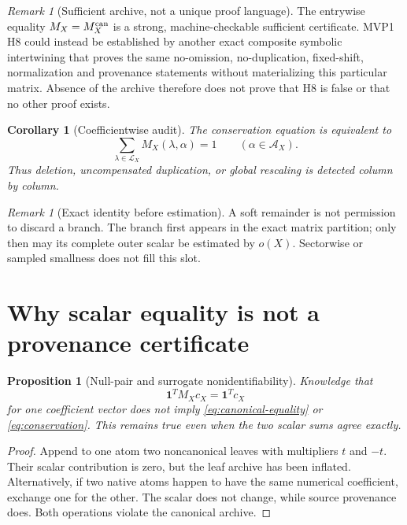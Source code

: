 \documentclass[11pt,a4paper]{article}
\newtheorem{proposition}[theorem]{Proposition}
\newtheorem{corollary}[theorem]{Corollary}
\theoremstyle{definition}
\theoremstyle{remark}
\newtheorem{remark}[theorem]{Remark}
\newcommand{\one}{\mathbf 1}
\newcommand{\cA}{\mathcal A}
\newcommand{\cL}{\mathcal L}
\begin{document}
\begin{remark}[Sufficient archive, not a unique proof language]
\label{rem:not-necessary}
The entrywise equality \(M_X=M_X^{\rm can}\) is a strong,
machine-checkable sufficient certificate.  MVP1 H8 could instead be
established by another exact composite symbolic intertwining that
proves the same no-omission, no-duplication, fixed-shift,
normalization and provenance statements without materializing this
particular matrix.  Absence of the archive therefore does not prove
that H8 is false or that no other proof exists.
\end{remark}

\begin{corollary}[Coefficientwise audit]
\label{cor:column}
The conservation equation is equivalent to
\[
 \sum_{\lambda\in\cL_X}M_X(\lambda,\alpha)=1
 \qquad(\alpha\in\cA_X).
\]
Thus deletion, uncompensated duplication, or global rescaling is
detected column by column.
\end{corollary}

\begin{remark}[Exact identity before estimation]
A soft remainder is not permission to discard a branch.  The branch
first appears in the exact matrix partition; only then may its complete
outer scalar be estimated by \(o(X)\).  Sectorwise or sampled smallness
does not fill this slot.
\end{remark}

\section{Why scalar equality is not a provenance certificate}

\begin{proposition}[Null-pair and surrogate nonidentifiability]
\label{prop:null}
Knowledge that
\[
 \one^TM_Xc_X=\one^Tc_X
\]
for one coefficient vector does not imply
\eqref{eq:canonical-equality} or \eqref{eq:conservation}.  This remains
true even when the two scalar sums agree exactly.
\end{proposition}

\begin{proof}
Append to one atom two noncanonical leaves with multipliers \(t\) and
\(-t\).  Their scalar contribution is zero, but the leaf archive has
been inflated.  Alternatively, if two native atoms happen to have the
same numerical coefficient, exchange one for the other.  The scalar
does not change, while source provenance does.  Both operations violate
the canonical archive.
\end{proof}
\end{document}
